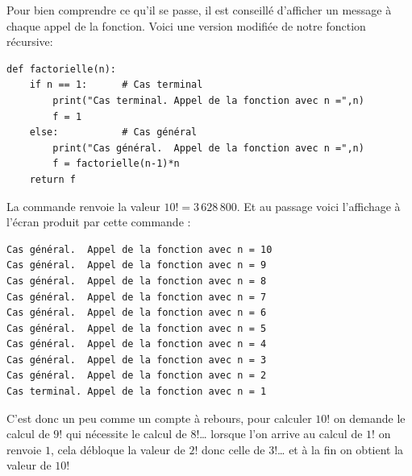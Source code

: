 \documentclass[11pt,class=report,crop=false]{standalone}
\begin{document}
\begin{cours}
Pour bien comprendre ce qu'il se passe, il est conseillé d'afficher un message à chaque appel de la fonction. Voici une version modifiée de notre fonction récursive:
\begin{center}
\begin{lstlisting}
def factorielle(n):
    if n == 1:      # Cas terminal
        print("Cas terminal. Appel de la fonction avec n =",n)
        f = 1
    else:           # Cas général
        print("Cas général.  Appel de la fonction avec n =",n)
        f = factorielle(n-1)*n
    return f
\end{lstlisting}
\end{center} 
La commande  renvoie la valeur $10! = 3\,628\,800$. Et au passage voici l'affichage à l'écran produit par cette commande :
\begin{center}
\begin{lstlisting}
Cas général.  Appel de la fonction avec n = 10
Cas général.  Appel de la fonction avec n = 9
Cas général.  Appel de la fonction avec n = 8
Cas général.  Appel de la fonction avec n = 7
Cas général.  Appel de la fonction avec n = 6
Cas général.  Appel de la fonction avec n = 5
Cas général.  Appel de la fonction avec n = 4
Cas général.  Appel de la fonction avec n = 3
Cas général.  Appel de la fonction avec n = 2
Cas terminal. Appel de la fonction avec n = 1
\end{lstlisting}
\end{center}

C'est donc un peu comme un compte à rebours, pour calculer $10!$ on demande le calcul de $9!$ qui nécessite le calcul de $8!$\ldots{} lorsque l'on arrive au calcul de $1!$ on renvoie $1$, cela débloque la valeur de $2!$ donc celle de $3!$\ldots{} et à la fin on obtient la valeur de $10!$
\end{cours}

\end{document}
